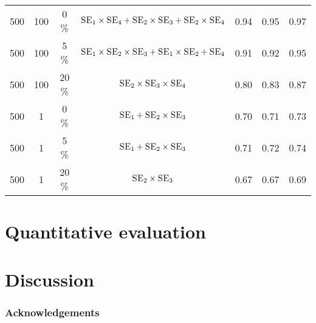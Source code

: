 \documentclass[twoside]{article}
\begin{document}
\begin{table*}[ht!]
\begin{center}
{\begin{tabular}{|c c  c | c |  c | c c| }
\hline  500    &   100  &  0 \%   &    $\textsc{SE}_1 \times \textsc{SE}_4 + \textsc{SE}_2 \times \textsc{SE}_3 + \textsc{SE}_2 \times \textsc{SE}_4   $   &    0.94  &  0.95 & 0.97 \\
	500    &   100  &  5 \%   &    $\textsc{SE}_1 \times \textsc{SE}_2 \times \textsc{SE}_3 + \textsc{SE}_1 \times \textsc{SE}_2 + \textsc{SE}_4 $   &    0.91  &  0.92 & 0.95 \\
	500    &   100  &  20 \%   &    $\textsc{SE}_2 \times \textsc{SE}_3 \times \textsc{SE}_4$   &    0.80  &  0.83 & 0.87 \\ 
	500    &   1  &  0 \%   &    $\textsc{SE}_1 + \textsc{SE}_2 \times \textsc{SE}_3  $   &    0.70  &  0.71 & 0.73    \\
	500    &   1  &  5 \%   &   $\textsc{SE}_1 + \textsc{SE}_2 \times \textsc{SE}_3  $   &    0.71  &  0.72 & 0.74    \\
	500    &   1  &  20 \%   &    $ \textsc{SE}_2 \times \textsc{SE}_3 $  &    0.67  &  0.67 & 0.69 \\
\hline
\end{tabular}
}
\end{center}
\end{table*}


\clearpage



\section{Quantitative evaluation}
\label{sec:quantitative}




\section{Discussion}

\subsubsection*{Acknowledgements}

\newpage


\end{document}
